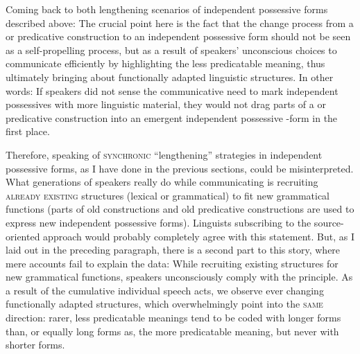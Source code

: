 \documentclass[output=paper]{langsci/langscibook}
\begin{document}
Coming back to both lengthening scenarios of independent possessive forms described above: The crucial point here is the fact that the change process from a  or predicative construction to an independent possessive form should not be seen as a self-propelling  process, but as a result of speakers' unconscious choices to communicate efficiently by highlighting the less predicatable meaning, thus ultimately bringing about functionally adapted linguistic structures. In other words: If speakers did not sense the communicative need to mark independent possessives with more linguistic material, they would not drag parts of a  or predicative construction into an emergent independent possessive -form in the first place. 

Therefore, speaking of \textsc{synchronic} “lengthening” strategies in independent possessive forms, as I have done in the previous sections, could be misinterpreted. What generations of speakers really do while communicating is recruiting \textsc{already} \textsc{existing} structures (lexical or grammatical) to fit new grammatical functions (parts of old  constructions and old predicative constructions are used to express new independent possessive forms). Linguists subscribing to the source-oriented approach would probably completely agree with this statement. But, as I laid out in the preceding paragraph, there is a second part to this story, where mere  accounts fail to explain the data: While recruiting existing structures for new grammatical functions, speakers unconsciously comply with the  principle. As a result of the cumulative individual speech acts, we observe ever changing functionally adapted structures, which overwhelmingly point into the \textsc{same} direction: rarer, less predicatable meanings tend to be coded with longer forms than, or equally long forms as, the more predicatable meaning, but never with shorter forms. 
\end{document}

